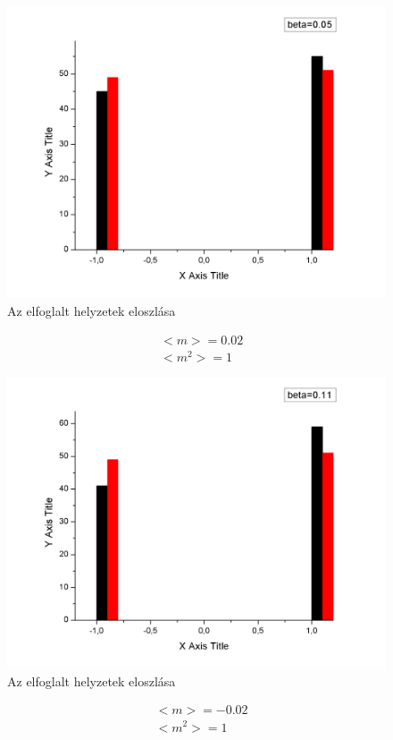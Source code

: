 \documentclass[paper=a4, fontsize=11pt]{article}
\begin{document}
\begin{figure}[H]
\includegraphics[width=\textwidth]{005}
\caption{Az elfoglalt helyzetek eloszlása}
\end{figure}

\begin{align}
&<m>=0.02\\
&<m^2>=1
\end{align}


\begin{figure}[H]
\includegraphics[width=\textwidth]{011}
\caption{Az elfoglalt helyzetek eloszlása}
\end{figure}

\begin{align}
&<m>=-0.02\\
&<m^2>=1
\end{align}
\end{document}
